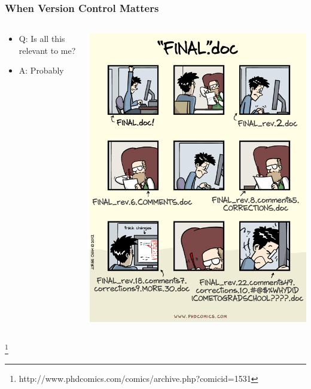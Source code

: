 \documentclass{beamer}
\begin{document}
\begin{frame} %
  \frametitle{When Version Control Matters}
  
  \begin{columns}
    \begin{column}{.5\textwidth}
      \begin{itemize}
      \item Q: Is all this relevant to me?
      \item A: Probably 
      \end{itemize} 
    \end{column}
    
    \begin{column}{.5\textwidth}
        \centering
        \includegraphics[height=.8\textheight]{img/final} 
    \end{column}
  \end{columns}
  \footnote{http://www.phdcomics.com/comics/archive.php?comicid=1531}
\end{frame}
\end{document}
